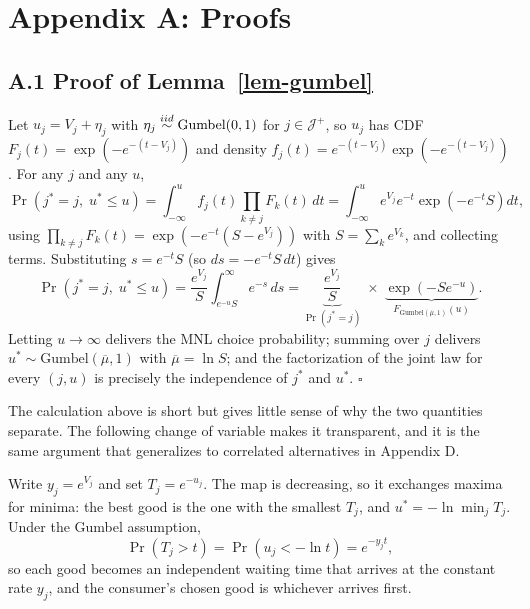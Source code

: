 \documentclass[
  letterpaper,
  DIV=11,
  numbers=noendperiod]{scrartcl}
\theoremstyle{plain}
\theoremstyle{plain}
\theoremstyle{remark}
\begin{document}
\section*{Appendix A: Proofs}\label{sec-appendix-proofs}

\subsection*{\texorpdfstring{A.1 Proof of
Lemma~\ref{lem-gumbel}}{A.1 Proof of Lemma~}}\label{a.1-proof-of-lem-gumbel}

Let \(u_j = V_j + \eta_j\) with \(\eta_j \stackrel{iid}{\sim} \text{Gumbel}(0,1)\) for
\(j \in \mathcal{J}^+\), so \(u_j\) has CDF
\(F_j(t) = \exp\left( -e^{-(t - V_j)} \right)\) and density
\(f_j(t) = e^{-(t-V_j)} \exp\left( -e^{-(t-V_j)} \right)\). For any
\(j\) and any \(u\), \[
\Pr \left( j^* = j, \; u^* \le u \right)
= \int_{-\infty}^{u} f_j(t) \prod_{k \ne j} F_k(t) \, dt
= \int_{-\infty}^{u} e^{V_j} e^{-t} \exp \left( -e^{-t} S \right) dt,
\] using
\(\prod_{k \ne j} F_k(t) = \exp\left( -e^{-t} \left( S - e^{V_j} \right) \right)\)
with \(S = \sum_{k} e^{V_k}\), and collecting terms. Substituting
\(s = e^{-t} S\) (so \(ds = -e^{-t} S \, dt\)) gives \[
\Pr \left( j^* = j, \; u^* \le u \right)
= \frac{e^{V_j}}{S} \int_{e^{-u} S}^{\infty} e^{-s} \, ds
= \underbrace{\frac{e^{V_j}}{S}}_{\Pr\left(j^*=j\right)} \; \times \; \underbrace{\exp \left( -S e^{-u} \right)}_{F_{\text{Gumbel}\left(\overline{\mu},1\right)}(u)}.
\] Letting \(u \to \infty\) delivers the MNL choice probability; summing
over \(j\) delivers \(u^* \sim \text{Gumbel}(\overline{\mu}, 1)\) with
\(\overline{\mu} = \ln S\); and the factorization of the joint law for
every \((j, u)\) is precisely the independence of \(j^*\) and \(u^*\).
\(\square\)

The calculation above is short but gives little sense of why the two
quantities separate. The following change of variable makes it
transparent, and it is the same argument that generalizes to correlated
alternatives in Appendix D.

Write \(y_j = e^{V_j}\) and set \(T_j = e^{-u_j}\). The map is
decreasing, so it exchanges maxima for minima: the best good is the one
with the smallest \(T_j\), and \(u^* = -\ln \min_j T_j\). Under the
Gumbel assumption, \[
\Pr \left( T_j > t \right) = \Pr \left( u_j < -\ln t \right) = e^{-y_j t},
\] so each good becomes an independent waiting time that arrives at the
constant rate \(y_j\), and the consumer's chosen good is whichever
arrives first.
\end{document}
